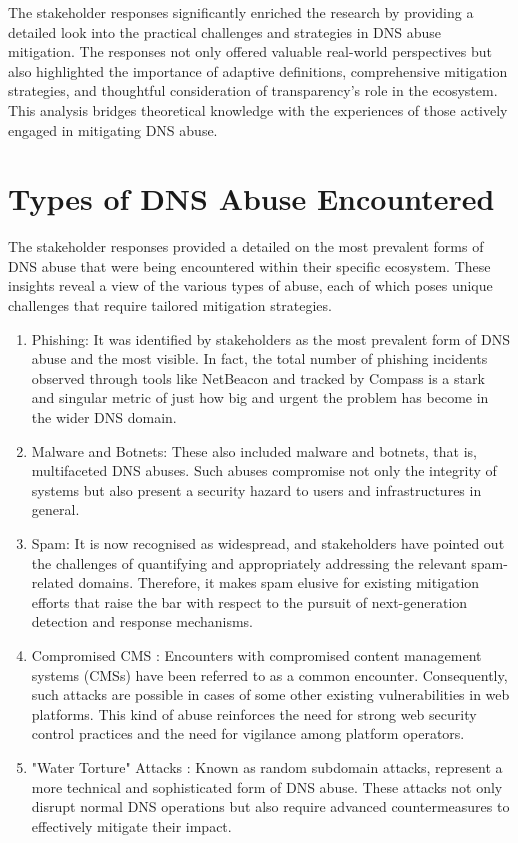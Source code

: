 The stakeholder responses significantly enriched the research by providing a detailed look into the practical challenges and strategies in DNS abuse mitigation. The responses not only offered valuable real-world perspectives but also highlighted the importance of adaptive definitions, comprehensive mitigation strategies, and thoughtful consideration of transparency's role in the ecosystem. This analysis bridges theoretical knowledge with the experiences of those actively engaged in mitigating DNS abuse.

\section{Types of DNS Abuse Encountered} 

The stakeholder responses provided a detailed on the most prevalent forms of DNS abuse that were being encountered within their specific ecosystem. These insights reveal a view of the various types of abuse, each of which poses unique challenges that require tailored mitigation strategies.

\begin{enumerate}
    \item Phishing: It was identified by stakeholders as the most prevalent form of DNS abuse and the most visible. In fact, the total number of phishing incidents observed through tools like NetBeacon and tracked by Compass is a stark and singular metric of just how big and urgent the problem has become in the wider DNS domain.
    \item Malware and Botnets: These also included malware and botnets, that is, multifaceted DNS abuses. Such abuses compromise not only the integrity of systems but also present a security hazard to users and infrastructures in general.
    \item Spam: It is now recognised as widespread, and stakeholders have pointed out the challenges of quantifying and appropriately addressing the relevant spam-related domains. Therefore, it makes spam elusive for existing mitigation efforts that raise the bar with respect to the pursuit of next-generation detection and response mechanisms.
    \item Compromised CMS : Encounters with compromised content management systems (CMSs) have been referred to as a common encounter. Consequently, such attacks are possible in cases of some other existing vulnerabilities in web platforms. This kind of abuse reinforces the need for strong web security control practices and the need for vigilance among platform operators.
    \item "Water Torture" Attacks : Known as random subdomain attacks, represent a more technical and sophisticated form of DNS abuse. These attacks not only disrupt normal DNS operations but also require advanced countermeasures to effectively mitigate their impact.
\end{enumerate}

